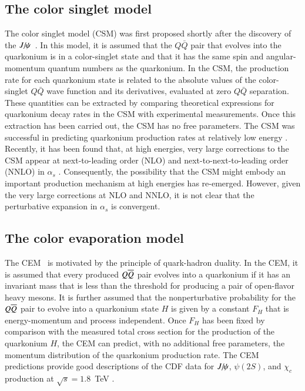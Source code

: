 \subsection{The color singlet model}


The color singlet model (CSM) was first proposed shortly after the discovery of the 
$J\hspace{-.08em}/\hspace{-.14em}\psi$~\cite{Einhorn:1975ua,Ellis:1976fj,Carlson:1976cd,Berger:1980ni}.
In this model, it is assumed that the $Q\bar Q$ pair that evolves into
the quarkonium is in a color-singlet state and that it has the same spin
and angular-momentum quantum numbers as the quarkonium. In the CSM, the
production rate for each quarkonium state is related to the absolute
values of the color-singlet $Q\bar Q$ wave function and its derivatives,
evaluated at zero $Q\bar Q$ separation. These quantities can be
extracted by comparing theoretical expressions for quarkonium decay
rates in the CSM with experimental measurements. Once this extraction
has been carried out, the CSM has no free parameters. The CSM was
successful in predicting quarkonium production rates at relatively low
energy \cite{Schuler:1994hy}. Recently, it has been found that, at high
energies, very large corrections to the CSM appear at next-to-leading
order (NLO) and next-to-next-to-leading order (NNLO) in $\alpha_s$
\cite{Artoisenet:2007xi,Campbell:2007ws,Artoisenet:2008fc}.
Consequently, the possibility that the CSM might embody an important 
production mechanism at high energies has re-emerged. 
However, given the very large corrections at
NLO and NNLO, it is not clear that the perturbative expansion in
$\alpha_s$ is convergent. 

\subsection{The color evaporation model}  
\label{prod_sec:CEM}

The CEM~\cite{Fritzsch:1977ay,Amundson:1995em,Amundson:1996qr}
is motivated by the principle of quark-hadron duality. In the CEM, it
is assumed that every produced $Q \overline{Q}$ pair evolves into a quarkonium
if it has an invariant mass that is less than the threshold for
producing a pair of open-flavor heavy mesons. It is further assumed that
the nonperturbative probability for the $Q \overline{Q}$ pair to evolve into a
quarkonium state $H$ is given by a constant $F_H$ that is
energy-momentum and process independent. Once $F_H$ has been fixed by
comparison with the measured total cross section for the production of
the quarkonium $H$, the CEM can predict, with no additional free
parameters, the momentum distribution of the quarkonium production rate. The
CEM predictions provide good descriptions of the CDF data for $J\hspace{-.08em}/\hspace{-.14em}\psi$,
$\psi(2S)$, and $\chi_{c}$ production at $\sqrt{s}=1.8$~TeV
\cite{Amundson:1996qr}. 

